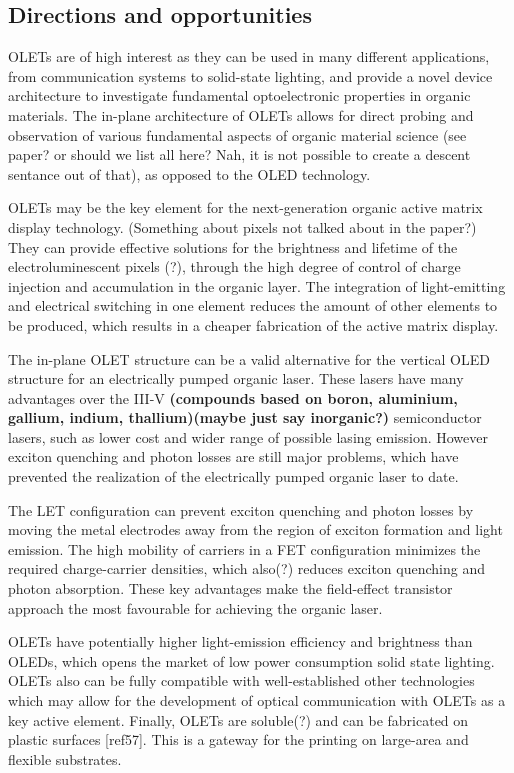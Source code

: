 \subsection{Directions and opportunities} %

OLETs are of high interest as they can be used in many different applications, from communication systems to solid-state lighting, and provide a novel device architecture to investigate fundamental optoelectronic properties in organic materials. The in-plane architecture of OLETs allows for direct probing and observation of various fundamental aspects of organic material science (see paper? or should we list all here? Nah, it is not possible to create a descent sentance out of that), as opposed to the OLED technology.

OLETs may be the key element for the next-generation organic active matrix display technology. (Something about pixels not talked about in the paper?) They can provide effective solutions for the brightness and lifetime of the electroluminescent pixels (?), through the high degree of control of charge injection and accumulation in the organic layer. The integration of light-emitting and electrical switching in one element reduces the amount of other elements to be produced, which results in a cheaper fabrication of the active matrix display.

The in-plane OLET structure can be a valid alternative for the vertical OLED structure for an electrically pumped organic laser. These lasers have many advantages over the III-V \textbf{(compounds based on boron, aluminium, gallium, indium, thallium)(maybe just say inorganic?)} semiconductor lasers, such as lower cost and wider range of possible lasing emission. However exciton quenching and photon losses are still major problems, which have prevented the realization of the electrically pumped organic laser to date.

The LET configuration can prevent exciton quenching and photon losses by moving the metal electrodes away from the region of exciton formation and light emission. The high mobility of carriers in a FET configuration minimizes the required charge-carrier densities, which also(?) reduces exciton quenching and photon absorption. These key advantages make the field-effect transistor approach the most favourable for achieving the organic laser.

OLETs have potentially higher light-emission efficiency and brightness than OLEDs, which opens the market of low power consumption solid state lighting. OLETs also can be fully compatible with well-established other technologies which may allow for the development of optical communication with OLETs as a key active element. Finally, OLETs are soluble(?) and can be fabricated on plastic surfaces [ref57]. This is a gateway for the printing on large-area and flexible substrates.
